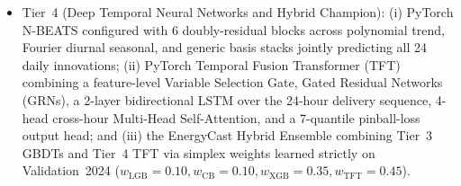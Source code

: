\documentclass[journal,10pt,twocolumn]{IEEEtran}
\begin{document}
\begin{itemize}
\begin{equation}
\begin{aligned}
    \end{aligned}
    \label{eq:gbdt_gain}
    \end{equation}
    \item Tier~4 (Deep Temporal Neural Networks and Hybrid Champion): (i) PyTorch N-BEATS \cite{oreshkin2020nbeats} configured with 6 doubly-residual blocks across polynomial trend, Fourier diurnal seasonal, and generic basis stacks jointly predicting all 24 daily innovations; (ii) PyTorch Temporal Fusion Transformer (TFT) \cite{lim2021temporal} combining a feature-level Variable Selection Gate, Gated Residual Networks (GRNs), a 2-layer bidirectional LSTM over the 24-hour delivery sequence, 4-head cross-hour Multi-Head Self-Attention, and a 7-quantile pinball-loss output head; and (iii) the EnergyCast Hybrid Ensemble combining Tier~3 GBDTs and Tier~4 TFT via simplex weights learned strictly on Validation~2024 ($w_{\text{LGB}}=0.10, w_{\text{CB}}=0.10, w_{\text{XGB}}=0.35, w_{\text{TFT}}=0.45$).
\end{itemize}
\end{document}
